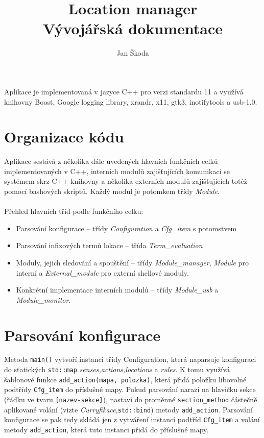 \documentclass[10pt,a4paper]{article}
\author{Jan Škoda}
\title{Location manager \\ Vývojářská dokumentace}
\begin{document}
\maketitle
\pagestyle{empty}


Aplikace je implementovaná v jazyce C++ pro verzi standardu 11 a využívá knihovny Boost, Google logging library, xrandr, x11, gtk3, inotifytools a usb-1.0. 

\section*{Organizace kódu}
Aplikace sestává z několika dále uvedených hlavních funkčních celků implementovaných v C++, interních modulů zajišťujících komunikaci se systémem skrz C++ knihovny a několika externích modulů zajišťujících totéž pomocí bashových skriptů. Každý modul je potomkem třídy {\it Module}. \\
\\
Přehled hlavních tříd podle funkčního celku:
\begin{itemize}
    \item Parsování konfigurace -- třídy {\it Configuration} a {\it Cfg\_item} s potomstvem
    \item Parsování infixových termů lokace -- třída {\it Term\_evaluation}
    \item Moduly, jejich sledování a spouštění -- třídy {\it Module\_manager}, {\it Module} pro interní a {\it External\_module} pro externí shellové moduly.
    \item Konkrétní implementace interních modulů -- třídy {\it Module\_usb} a {\it Module\_monitor}.
\end{itemize}

\section*{Parsování konfigurace}
Metoda \texttt{main()} vytvoří instanci třídy Configuration, která naparsuje konfiguraci do statických \texttt{std::map} {\it senses,actions,locations} a {\it rules}. K tomu využívá šablonové funkce \texttt{add\_action(mapa, polozka)}, která přidá položku libovolné podtřídy \texttt{Cfg\_item} do příslušné mapy. Pokud parsování narazí na hlavičku sekce (řádku ve tvaru \texttt{[nazev-sekce]}), nastaví do proměnné \texttt{section\_method} částečně aplikované volání (vizte {\it Curryfikace},\texttt{std::bind}) metody \texttt{add\_action}. Parsování konfigurace se pak tedy skládá jen z vytváření instancí podtříd \texttt{Cfg\_item} a volání metody \texttt{add\_action}, která tuto instanci přidá do příslušné mapy. \\
\end{document}
